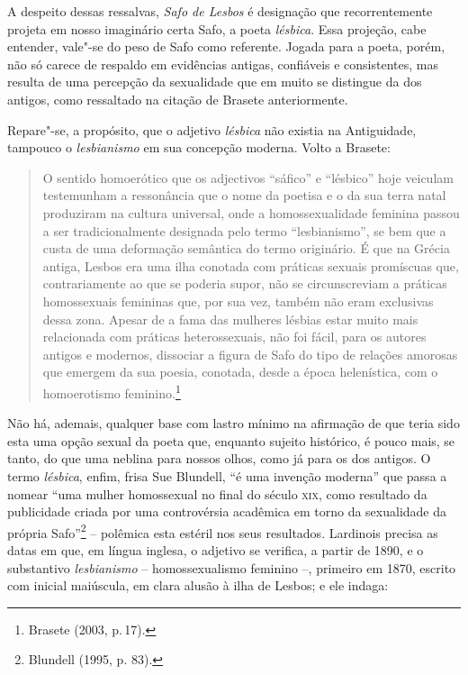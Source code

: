 A despeito dessas ressalvas, \textit{Safo de Lesbos} é designação que
recorrentemente projeta em nosso imaginário certa Safo, a poeta
\textit{lésbica}. Essa projeção, cabe entender, vale"-se do peso de Safo como referente. 
Jogada para a poeta, porém, não só carece de respaldo em evidências antigas,
confiáveis e consistentes, mas resulta de uma percepção da
sexualidade que em muito se distingue da dos antigos, como ressaltado na citação de Brasete anteriormente.

Repare"-se, a propósito, que o adjetivo \textit{lésbica} não existia na
Antiguidade, tampouco o \textit{lesbianismo} em sua concepção moderna.
Volto a Brasete:

\begin{quote}
O sentido homoerótico que os adjectivos ``sáfico'' e ``lésbico'' hoje veiculam testemunham a ressonância que o nome da poetisa e o da sua terra natal produziram na cultura universal, onde a homossexualidade feminina passou a ser tradicionalmente designada pelo termo ``lesbianismo'', se bem que a custa de uma deformação semântica do termo originário. É que na Grécia antiga, Lesbos era uma ilha conotada com práticas sexuais promíscuas que, contrariamente ao que se poderia supor, não se circunscreviam a práticas homossexuais femininas que, por sua vez, também não eram exclusivas dessa zona. Apesar de a fama das mulheres lésbias estar muito mais relacionada com práticas heterossexuais, não foi fácil, para os autores antigos e modernos, dissociar a figura de Safo do tipo de relações amorosas que emergem da sua poesia, conotada, desde a época helenística, com o homoerotismo feminino.\footnote{Brasete (2003, p.\,17).}
\end{quote}

\noindent{}Não há,
ademais, qualquer base com lastro mínimo na afirmação de que teria sido esta
uma opção sexual da poeta que, enquanto sujeito histórico, é pouco mais, se
tanto, do que uma neblina para nossos olhos, como já para os dos antigos. O
termo \textit{lésbica}, enfim, frisa Sue Blundell, “é uma
invenção moderna” que passa a nomear “uma mulher homossexual no final do século
\textsc{xix}, como resultado da publicidade criada por uma controvérsia acadêmica em
torno da sexualidade da própria Safo”\footnote{ Blundell (1995, p. 83).} -- polêmica esta 
estéril nos seus resultados.
Lardinois precisa as datas em que, em
língua inglesa, o adjetivo se verifica, a partir de 1890, e o substantivo
\textit{lesbianismo} -- homossexualismo feminino --, primeiro em 1870, escrito com
inicial maiúscula, em clara alusão à ilha de Lesbos; e ele indaga:

